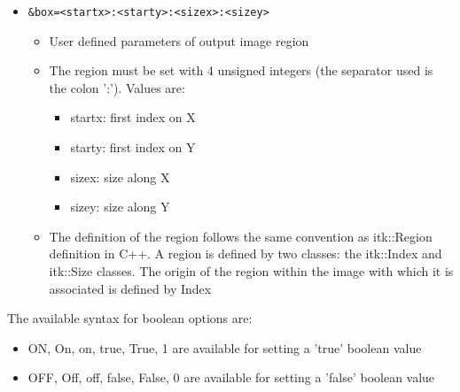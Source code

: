 \begin{itemize}
\item \begin{verbatim}&box=<startx>:<starty>:<sizex>:<sizey>\end{verbatim}
\begin{itemize}
    \item User defined parameters of output image region
    \item The region must be set with 4 unsigned integers (the separator used is
      the colon ':'). Values are:
      \begin{itemize}
        \item startx: first index on X
        \item starty: first index on Y
        \item sizex: size along X
        \item sizey: size along Y 
      \end{itemize}
    \item The definition of the region follows the same convention as itk::Region
    definition in C++. A region is defined by two classes: the itk::Index and
    itk::Size classes. The origin of the region within the image with which it
    is associated is defined by Index 
\end{itemize}

\end{itemize}

The available syntax for boolean options are:

\begin{itemize}
    \item ON, On, on, true, True, 1 are available for setting a 'true' boolean value
    \item OFF, Off, off, false, False, 0 are available for setting a 'false' boolean value
\end{itemize}


